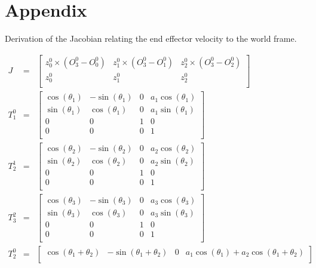 \documentclass[a4paper]{article}
\begin{document}
\newpage

\section*{Appendix}

\noindent Derivation of the Jacobian relating the end effector velocity to the world frame.

\begin{eqnarray*}
J & = & \begin{bmatrix}
		z^0_0 \times (O^0_3 - O_0^0) & z^0_1 \times (O^0_3 - O_1^0) & z^0_2 \times (O^0_3 - O_2^0)\\
        z_0^0 & z^0_1 & z^0_2\\
        \end{bmatrix}\\
T^0_1 & = & \begin{bmatrix}
 			\cos(\theta_1) & -\sin(\theta_1) & 0 & a_1\cos(\theta_1)\\
            \sin(\theta_1) & \cos(\theta_1) & 0 & a_1\sin(\theta_1)\\
            0 & 0 & 1 & 0\\
            0 & 0 & 0 & 1\\
			\end{bmatrix} \\
T^1_2 & = & \begin{bmatrix}
 			\cos(\theta_2) & -\sin(\theta_2) & 0 & a_2\cos(\theta_2)\\
            \sin(\theta_2) & \cos(\theta_2) & 0 & a_2\sin(\theta_2)\\
            0 & 0 & 1 & 0\\
            0 & 0 & 0 & 1\\
			\end{bmatrix} \\
T^2_3 & = & \begin{bmatrix}
 			\cos(\theta_3) & -\sin(\theta_3) & 0 & a_3\cos(\theta_3)\\
            \sin(\theta_3) & \cos(\theta_3) & 0 & a_3\sin(\theta_3)\\
            0 & 0 & 1 & 0\\
            0 & 0 & 0 & 1\\
			\end{bmatrix} \\
T^0_2 & = & \begin{bmatrix}
 			\cos(\theta_1 + \theta_2) & - \sin(\theta_1 + \theta_2) & 0 & a_1\cos(\theta_1) + a_2\cos(\theta_1 + \theta_2)\\

\end{bmatrix}
\end{eqnarray*}
\end{document}
